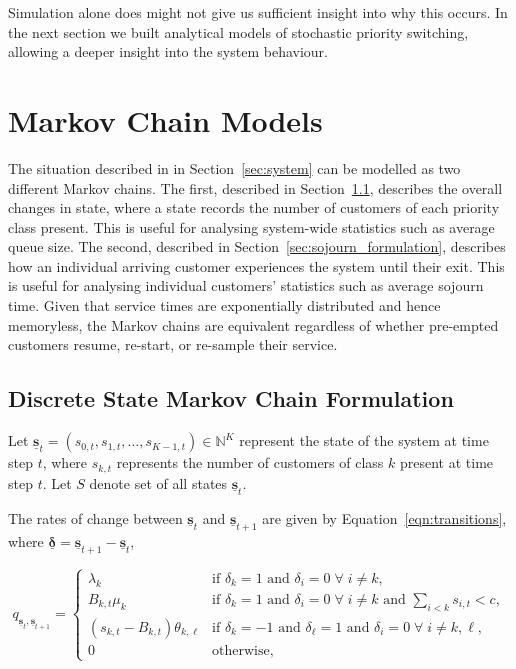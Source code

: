 \documentclass{article}
\begin{document}
Simulation alone does might not give us sufficient insight into why this occurs.
In the next section we built analytical models of stochastic priority switching,
allowing a deeper insight into the system behaviour.


\section{Markov Chain Models}\label{sec:makovchains}
The situation described in in Section~\ref{sec:system} can be modelled as two
different Markov chains.
The first, described in Section~\ref{sec:state_formulation}, describes the
overall changes in state, where a state records the number of customers of each
priority class present. This is useful for analysing system-wide statistics such
as average queue size.
The second, described in Section~\ref{sec:sojourn_formulation}, describes how an
individual arriving customer experiences the system until their exit. This is
useful for analysing individual customers' statistics such as average sojourn
time.
Given that service times are exponentially distributed and hence memoryless, the
Markov chains are equivalent regardless of whether pre-empted customers resume,
re-start, or re-sample their service.

\subsection{Discrete State Markov Chain Formulation}\label{sec:state_formulation}
Let
$\underline{\mathbf{s}}_t = (s_{0,t}, s_{1,t}, \dots, s_{K-1,t}) \in \mathbb{N}^K$
represent the state of the system at time step $t$, where $s_{k,t}$ represents
the number of customers of class $k$ present at time step $t$. Let $S$ denote
set of all states $\underline{\mathbf{s}}_t$. 

The rates of change between $\underline{\mathbf{s}}_t$ and
$\underline{\mathbf{s}}_{t+1}$ are given by Equation~\ref{eqn:transitions},
where $\underline{\mathbf{\delta}} = \underline{\mathbf{s}}_{t+1} - \underline{\mathbf{s}}_t$,

\begin{equation}\label{eqn:transitions}
q_{\underline{\mathbf{s}}_t, \underline{\mathbf{s}}_{t+1}} = 
\begin{cases}
\lambda_k & \text{if } \delta_k = 1 \text{ and } \delta_i = 0 \; \forall \; i \neq k, \\
B_{k,t} \mu_k & \text{if } \delta_k = 1 \text{ and } \delta_i = 0 \; \forall \; i \neq k \text{ and } \sum_{i < k} s_{i,t} < c, \\
(s_{k,t} - B_{k,t}) \theta_{k,\ell} & \text{if } \delta_{k} = -1 \text{ and } \delta_{\ell} = 1 \text{ and } \delta_i = 0 \; \forall \; i \neq k, \ell, \\
0 & \text{otherwise,}
\end{cases}
\end{equation}
\end{document}
